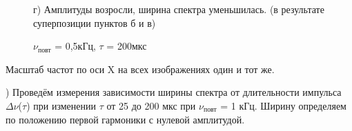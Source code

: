 \documentclass[a4paper,12pt]{article}
\begin{document}
\begin{figure}[h]
\caption{$\nu_{\text{повт}}$ = 0,5кГц, $\tau$ = 200мкс}
г) Амплитуды возросли, ширина спектра уменьшилась. (в результате суперпозиции пунктов б и в) 
\end{figure}

Масштаб частот по оси X на всех изображениях один и тот же.

) Проведём измерения зависимости ширины спектра от длительности импульса $\Delta\nu$($\tau$) при изменении $\tau$ от 25 до 200 мкс при $\nu_{\text{повт}}$ = 1 кГц. Ширину определяем по положению первой гармоники с нулевой амплитудой.
\end{document}
